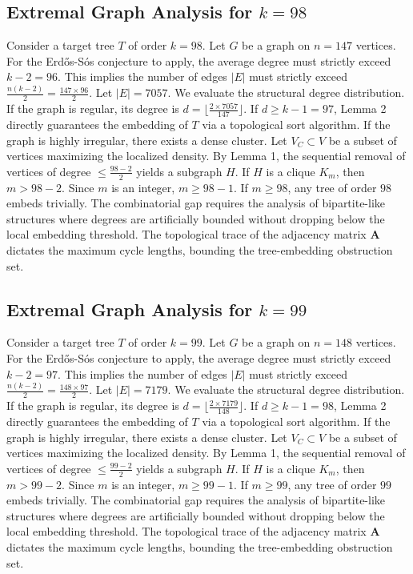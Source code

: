 \documentclass[11pt,a4paper]{article}
\begin{document}
\subsection{Extremal Graph Analysis for $k=98$}
Consider a target tree $T$ of order $k=98$.
Let $G$ be a graph on $n=147$ vertices.
For the Erd\H{o}s-S\'os conjecture to apply, the average degree must strictly exceed $k-2 = 96$.
This implies the number of edges $|E|$ must strictly exceed $\frac{n(k-2)}{2} = \frac{147 \times 96}{2}$.
Let $|E| = 7057$.
We evaluate the structural degree distribution. If the graph is regular, its degree is $d = \lfloor \frac{2 \times 7057}{147} \rfloor$.
If $d \geq k-1 = 97$, Lemma 2 directly guarantees the embedding of $T$ via a topological sort algorithm.
If the graph is highly irregular, there exists a dense cluster. Let $V_C \subset V$ be a subset of vertices maximizing the localized density.
By Lemma 1, the sequential removal of vertices of degree $\leq \frac{98-2}{2}$ yields a subgraph $H$.
If $H$ is a clique $K_{m}$, then $m > 98-2$. Since $m$ is an integer, $m \geq 98-1$. If $m \geq 98$, any tree of order $98$ embeds trivially.
The combinatorial gap requires the analysis of bipartite-like structures where degrees are artificially bounded without dropping below the local embedding threshold. The topological trace of the adjacency matrix $\mathbf{A}$ dictates the maximum cycle lengths, bounding the tree-embedding obstruction set.


\subsection{Extremal Graph Analysis for $k=99$}
Consider a target tree $T$ of order $k=99$.
Let $G$ be a graph on $n=148$ vertices.
For the Erd\H{o}s-S\'os conjecture to apply, the average degree must strictly exceed $k-2 = 97$.
This implies the number of edges $|E|$ must strictly exceed $\frac{n(k-2)}{2} = \frac{148 \times 97}{2}$.
Let $|E| = 7179$.
We evaluate the structural degree distribution. If the graph is regular, its degree is $d = \lfloor \frac{2 \times 7179}{148} \rfloor$.
If $d \geq k-1 = 98$, Lemma 2 directly guarantees the embedding of $T$ via a topological sort algorithm.
If the graph is highly irregular, there exists a dense cluster. Let $V_C \subset V$ be a subset of vertices maximizing the localized density.
By Lemma 1, the sequential removal of vertices of degree $\leq \frac{99-2}{2}$ yields a subgraph $H$.
If $H$ is a clique $K_{m}$, then $m > 99-2$. Since $m$ is an integer, $m \geq 99-1$. If $m \geq 99$, any tree of order $99$ embeds trivially.
The combinatorial gap requires the analysis of bipartite-like structures where degrees are artificially bounded without dropping below the local embedding threshold. The topological trace of the adjacency matrix $\mathbf{A}$ dictates the maximum cycle lengths, bounding the tree-embedding obstruction set.
\end{document}
